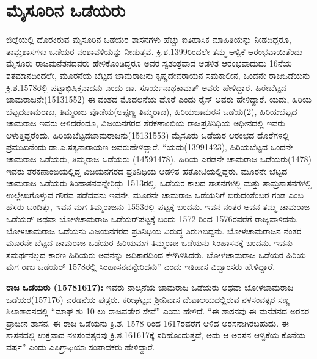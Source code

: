 \section{ಮೈಸೂರಿನ ಒಡೆಯರು}

ಜಿಲ್ಲೆಯಲ್ಲಿ ದೊರಕಿರುವ ಮೈಸೂರಿನ ಒಡೆಯರ ಶಾಸನಗಳು ಹೆಚ್ಚು ಐತಿಹಾಸಿಕ ಮಾಹಿತಿಯನ್ನು ನೀಡದಿದ್ದರೂ, ತಾಮ್ರಶಾಸಗಳು ಒಡೆಯರ ವಂಶಾವಳಿಯನ್ನು ನೀಡುತ್ತವೆ. ಕ್ರಿ.ಶ.1399ರಿಂದಲೇ ತಮ್ಮ ಆಳ್ವಿಕೆ ಆರಂಭವಾಯಿತೆಂದು ಮೈಸೂರು ರಾಜಮನೆತನ\-ದವರು ಹೇಳಿಕೊಂಡಿದ್ದರೂ ಅವರ ಸ್ವತಂತ್ರವಾದ ಆಡಳಿತ ಆರಂಭವಾದುದು 16ನೆಯ ಶತಮಾನದಿಂದಲೇ, ಮೂರನೆಯ ಬೆಟ್ಟದ ಚಾಮರಾಜನು ಕೃಷ್ಣದೇವರಾಯನ ಸಮಕಾಲೀನ, ಒಂದನೇ ರಾಜಒಡೆಯನು ಕ್ರಿ.ಶ.1578ರಲ್ಲಿ ಪಟ್ಟಾಭಿಷಿಕ್ತನಾದನು ಎಂದು ಡಾ. ಸೂರ್ಯನಾಥಕಾಮತ್​ ಅವರು ಹೇಳಿದ್ದಾರೆ. ಹಿರೇಬೆಟ್ಟದ ಚಾಮರಾಜನೇ(15131552) ಈ ವಂಶದ ಮೊದಲನೆಯ ದೊರೆ ಎಂದು ರೈಸ್​ ಅವರು ಹೇಳಿದ್ದಾರೆ. ಯದು, ಹಿರಿಯ ಬೆಟ್ಟದಚಾಮರಾಜ, ತಿಮ್ಮರಾಜ ವೊಡೆಯ(ಅಪ್ಪಣ್ಣ ತಿಮ್ಮರಾಜ), ಹಿರಿಯಚಾಮರಸ ಒಡೆಯ(2), ಹಿರಿಯಬೆಟ್ಟದ ಚಾಮರಾಜ ಇವರು ಆಳಿದರೆಂದೂ, ವಿಜಯನಗರದ ತೆರಕಣಾಂಬಿಯ ರಾಜಪ್ರತಿನಿಧಿಯ ಅಧೀನದಲ್ಲಿ ಇವರು ಆಳುತ್ತಿದ್ದರೆಂದು, ಹಿರಿಯಬೆಟ್ಟದಚಾಮರಾಜನು\break (15131553) ಮೈಸೂರು ಒಡೆಯರ ಆರಂಭದ ದೊರೆಗಳಲ್ಲಿ ಪ್ರಮುಖನೆಂದು ಡಾ.ಎ.ಸತ್ಯನಾರಾಯಣ ಅವರು\break ಹೇಳಿದ್ದಾರೆ. “ಯದು(13991423), ಹಿರಿಯಬೆಟ್ಟದ ಒಂದನೇ ಚಾಮರಾಜ ಒಡೆಯರು, ತಿಮ್ಮರಾಜ ಒಡೆಯರು (14591478), ಹಿರಿಯ ಎರಡನೇ ಚಾಮರಾಜ ಒಡೆಯರು(1478) ಇವರು ತೆರಕಣಾಂಬಿಯಲ್ಲಿದ್ದ ವಿಜಯನಗರದ ಪ್ರತಿನಿಧಿಯ ಆಡಳಿತ ಹತೋಟಿಯಲ್ಲಿದ್ದರು. ಮೂರನೇ ಬೆಟ್ಟದ ಚಾಮರಾಜ ಒಡೆಯರು ಸಿಂಹಾಸನವನ್ನೇರಿದ್ದು 1513ರಲ್ಲಿ, ಒಡೆಯರ ಕಾಲದ ಶಾಸನಗಳಲ್ಲಿ ಮತ್ತು ತಾಮ್ರಶಾಸನಗಳಲ್ಲಿ ಉಲ್ಲೇಖಗೊಳ್ಳುವ ಗೌರವ ಪಡೆದವನು ಇವನೇ, ಮೂರನೇ ಚಾಮರಾಜ ಒಡೆಯನಿಗೆ ಬಿರುದಂತೆಂಬರ ಗಂಡ ಎಂಬ ಹೆಸರು ಬಂದಿತ್ತು, ಇವನ ಮಗ ತಿಮ್ಮರಾಜನು 1553ರಲ್ಲಿ ಪಟ್ಟಕ್ಕೆ ಬಂದನು. ಇವನ ನಂತರ ಅವನ ತಮ್ಮ ಚಾಮರಾಜ ಒಡೆಯರ್​ ಅಥವಾ ಬೋಳಚಾಮರಾಜ ಒಡೆಯರ್​ ಪಟ್ಟಕ್ಕೆ ಬಂದು 1572 ರಿಂದ 1576ರವರೆಗೆ ರಾಜ್ಯವಾಳಿದನು. ಬೋಳಚಾಮರಾಜ ಒಡೆಯನು ವಿಜಯನಗರದ ಪ್ರತಿನಿಧಿಯ ವಿರುದ್ಧ ತಿರುಗಿಬಿದ್ದನು. ಬೋಳಚಾಮರಾಜನ ನಂತರ ಮೂರನೇ ಬೆಟ್ಟದ ಚಾಮರಾಜ ಒಡೆಯರ ಹಿರಿಯಮಗ ತಿಮ್ಮರಾಜ ಒಡೆಯನು ಸಿಂಹಾಸನಕ್ಕೆ ಬಂದನು. ಇವನು ಸಮರ್ಥನಲ್ಲದ ಕಾರಣ ಹಿರಿಯರು ಅವನನ್ನು ಅಧಿಕಾರದಿಂದ ಕೆಳಗಿಳಿಸಿದರು. ಬೋಳಚಾಮರಾಜ ಒಡೆಯರ ಹಿರಿಯ ಮಗ ರಾಜ ಒಡೆಯರ್​ 1578ರಲ್ಲಿ ಸಿಂಹಾಸನವನ್ನೇರಿದನು” ಎಂದು ಇತಿಹಾಸ ವಿದ್ವಾಂಸರು ಹೇಳಿದ್ದಾರೆ.

\textbf{ರಾಜ ಒಡೆಯರು (15781617): } ಇವರು ನಾಲ್ಕನೆಯ ಚಾಮರಾಜ ಒಡೆಯರು ಅಥವಾ ಬೋಳಚಾಮರಾಜ ಒಡೆಯರ(157176) ಎರಡನೆಯ ಪುತ್ರರು. ಕರೀಘಟ್ಟದ ಶ‍್ರೀನಿವಾಸ ದೇವಾಲಯದಲ್ಲಿರುವ ನಳಸಂವತ್ಸರ ಸಣ್ಣ ಶಿಲಾಶಾಸನದಲ್ಲಿ “ಮಾಘ ಶು 10 ಲು ರಾಜವಡೇರ ಸೇವೆ” ಎಂದು ಹೇಳಿದೆ. “ಈ ಶಾಸನವು ಈ ಮನೆತನದ ಅರಸರ ಪ್ರಾಚೀನ ಶಾಸನ. ಈ ರಾಜ ಒಡೆಯನು ಕ್ರಿ.ಶ. 1578 ರಿಂದ 1617ರವರೆಗೆ ಆಳಿದ ಅರಸನಾಗಿರಬಹುದು. ಈ ಶಾಸನದಲ್ಲಿ ಉಕ್ತವಾದ ನಳಸಂವತ್ಸರವು ಕ್ರಿ.ಶ.161617ಕ್ಕೆ ಸರಿಹೊಂದುತ್ತದೆ, ಅದು ಆ ಅರಸನ ಆಳ್ವಿಕೆಯ ಕೊನೆಯ ವರ್ಷ” ಎಂದು ಎಪಿಗ್ರಾಫಿಯಾ ಸಂಪಾದಕರು ಹೇಳಿದ್ದಾರೆ.

